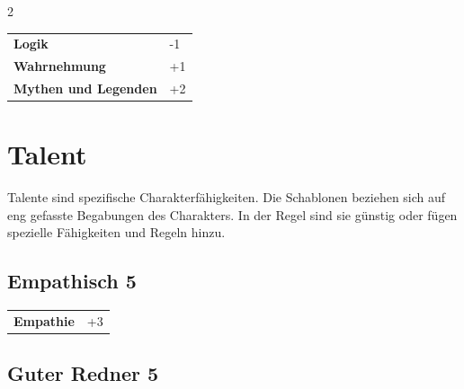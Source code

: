 \begin{multicols}{2}
\begin{tcolorbox}
\vspace{3mm}

\begin{tabular}{@{}ll@{}}
    \textbf{Logik} & -1\\
    \textbf{Wahrnehmung} & +1\\
    \textbf{Mythen und Legenden} & +2\\
\end{tabular}


\end{tcolorbox}

\section{Talent}

Talente sind spezifische Charakterfähigkeiten. Die Schablonen beziehen sich auf eng gefasste Begabungen des Charakters. In der Regel sind sie günstig oder fügen spezielle Fähigkeiten und Regeln hinzu.

\begin{tcolorbox}
    \subsection*{Empathisch \hfill \small{5 }}
    \tcblower




\begin{tabular}{@{}ll@{}}
    \textbf{Empathie} & +3\\
\end{tabular}


\end{tcolorbox}

\begin{tcolorbox}
    \subsection*{Guter Redner \hfill \small{5 }}
    \tcblower





\end{tcolorbox}
\end{multicols}
